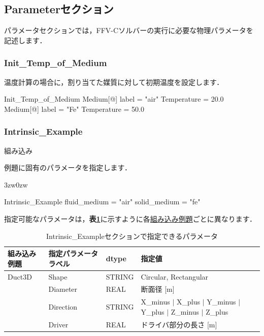 \pagebreak
\subsection{Parameterセクション}

パラメータセクションでは，FFV-Cソルバーの実行に必要な物理パラメータを記述します．


\subsubsection{Init\_Temp\_of\_Medium}
温度計算の場合に，割り当てた\hypertarget{tgt:initial_temp}{媒質}に対して初期温度を設定します．


{\small
\begin{program}
  Init_Temp_of_Medium {
    Medium[@] {
      label       = "air"
      Temperature = 20.0
    }
    Medium[@] {
      label       = "Fe"
      Temperature = 50.0
    }
  }
\end{program}
}



\pagebreak
\subsubsection{Intrinsic\_Example}

\hypertarget{tgt:intrinsic_example}{組み込み}例題に固有のパラメータを指定します．

\begin{indentation}{3zw}{0zw}
\small

\begin{program}
  Intrinsic_Example {
    fluid_medium = "air"
    solid_medium = "fe"
  }
\end{program}

\normalsize
指定可能なパラメータは，\textbf{表\ref{tbl:intrinsic_parameter}}に示すように各\hyperlink{tgt:example}{組み込み例題}ごとに異なります．

\begin{table}[htdp]
\caption{Intrinsic\_Exampleセクションで指定できるパラメータ}
\begin{center}
\small
\begin{tabular}{llll} \toprule
組み込み例題 & 指定パラメータラベル & dtype & 指定値\\ \midrule
Duct3D & Shape     & STRING & Circular, Rectangular\\
       & Diameter  & REAL   & 断面径 [m]\\
       & Direction & STRING & X\_minus $|$ X\_plus $|$ Y\_minus $|$ Y\_plus $|$ Z\_minus $|$ Z\_plus\\
       & Driver    & REAL   & ドライバ部分の長さ [m]\\ \bottomrule
\end{tabular}
\end{center}
\label{tbl:intrinsic_parameter}
\end{table}

\end{indentation}



